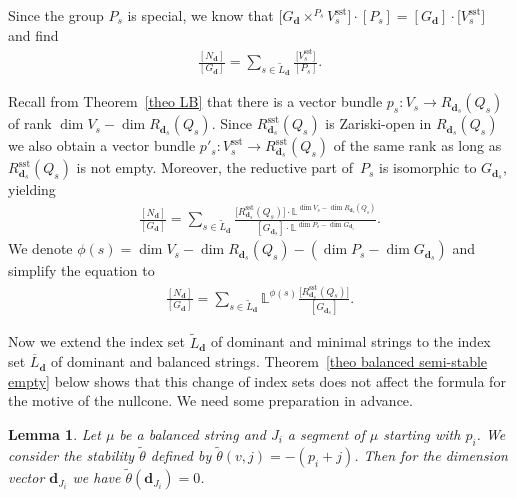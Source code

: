 \documentclass[pdftex]{sigma}
\numberwithin{equation}{section}
\newtheorem{Lemma}[Theorem]{Lemma}
\theoremstyle{definition}
\begin{document}
Since the group $P_s$ is special, we know that
$
\big[G_{\mathbf{d}} \times^{P_s} V_s^{\mathrm{sst}}\big] \cdot [P_s] = [G_{\mathbf{d}}] \cdot \big[V_s^{\mathrm{sst}}\big]
$
and find
\begin{align*}
\frac{[ N_{\mathbf{d}}]}{[ G_{\mathbf{d}}]} = \sum_{s \in \widetilde{L}_{\mathbf{d}}} \frac{\big[V_s^{\mathrm{sst}}\big]}{[P_s]} .
\end{align*}

Recall from Theorem~\ref{theo LB} that there is a vector bundle
$
p_s \colon V_s \rightarrow R_{\mathbf{d}_s} (Q_s)
$
 of rank $\dim V_s -\dim R_{\mathbf{d}_s}(Q_s)$. Since $R^{\mathrm{sst}}_{\mathbf{d}_s}(Q_s)$ is Zariski-open in $R_{\mathbf{d}_s} (Q_s)$ we also obtain a vector bundle
$
 p'_s\colon V_s^{\mathrm{sst}} \allowbreak\rightarrow R^{\mathrm{sst}}_{\mathbf{d}_s}(Q_s)
$
 of the same rank as long as $ R^{\mathrm{sst}}_{\mathbf{d}_s}(Q_s)$ is not empty. Moreover, the reductive part of~$P_s$ is isomorphic to $G_{\mathbf{d}_s}$, yielding
\begin{align*}
\frac{[ N_{\mathbf{d}}]}{[ G_{\mathbf{d}}]} =\sum_{s \in \widetilde{L}_{\mathbf{d}}} \frac{\big[R^{\mathrm{sst}}_{\mathbf{d}_s}(Q_s)\big] \cdot \mathbb{L}^{\dim V_s -\dim R_{\mathbf{d}_s}(Q_s)}}{[G_{\mathbf{d}_s}] \cdot \mathbb{L}^{\dim P_s - \dim G_{\mathbf{d}_s}}}.
\end{align*}
We denote $\phi(s) = \dim V_s -\dim R_{\mathbf{d}_s}(Q_s) -( \dim P_s - \dim G_{\mathbf{d}_s})$ and simplify the equation to
\begin{align} \label{formula motive}
\frac{[ N_{\mathbf{d}}]}{[ G_{\mathbf{d}}]} = \sum_{s \in {\widetilde{L}_{\mathbf{d}}}} \mathbb{L}^{\phi(s)} \frac{\big[R^{\mathrm{sst}}_{\mathbf{d}_s}(Q_s)\big]}{[G_{\mathbf{d}_s}]} .
\end{align}

Now we extend the index set $\widetilde{L}_{\mathbf{d}}$ of dominant and minimal strings to the index set $\overline{L}_{\mathbf{d}}$ of dominant and balanced strings. Theorem~\ref{theo balanced semi-stable empty} below shows that this change of index sets does not affect the formula for the motive of the nullcone. We need some preparation in advance.

\begin{Lemma} \label{lem balanc stab =0}
Let $\mu$ be a balanced string and $J_i$ a segment of $\mu$ starting with $p_i$. We consider the stability $\tilde{\theta}$ defined by $\tilde{\theta}(v,j) = -(p_i+j)$. Then for the dimension vector $\mathbf{d}_{J_i}$ we have $\tilde{\theta} (\mathbf{d}_{J_i})=0$.
\end{Lemma}
\end{document}

